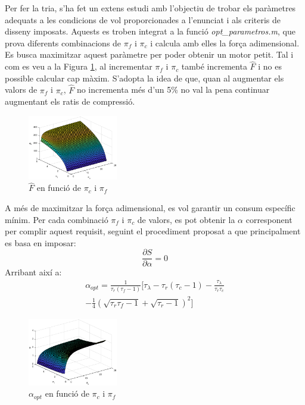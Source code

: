 \noindent Per fer la tria,  s'ha fet un extens estudi amb l'objectiu de trobar els paràmetres adequats a les condicions de vol proporcionades a l'enunciat i als criteris de disseny imposats. Aquests es troben integrat a la funció \textit{opt\_parametros.m}, que prova diferents combinacions de $\pi_f$ i $\pi_c$ i calcula amb elles la força adimensional. Es busca maximitzar aquest paràmetre per poder obtenir un motor petit. Tal i com es veu a la Figura \ref{Fadimensional}, al incrementar $\pi_f$ i $\pi_c$ també incrementa \(\hat{F}\) i no es possible calcular cap màxim. S'adopta la idea de que, quan al augmentar els valors de $\pi_f$ i $\pi_c$, \(\hat{F}\) no incrementa més d'un 5\% no val la pena continuar augmentant els ratis de compressió.
\begin{figure}[H]
	\centering
	\includegraphics[width=0.35\textwidth]{./pics/F_pc_pf}
	\caption{\(\hat{F}\) en funció de $\pi_c$ i $\pi_f$}
	\label{Fadimensional}
\end{figure}
\noindent A més de maximitzar la força adimensional, es vol garantir un consum específic mínim. Per cada combinació  $\pi_f$ i $\pi_c$ de valors, es pot obtenir la $\alpha$ corresponent per complir aquest requisit, seguint el procediment proposat a \cite[5-10]{mattingly} que principalment es basa en imposar:
\begin{equation*}
	\frac{\partial S}{\partial \alpha} = 0 
\end{equation*}
Arribant així a:
\begin{multline}
	\alpha_{opt} = \frac{1}{\tau_r(\tau_f-1)}\bigg[\tau_{\lambda}-\tau_r(\tau_c-1)-\frac{\tau_{\lambda}}{\tau_r\tau_c} \\ -\frac{1}{4}(\sqrt{\tau_r\tau_f-1} + \sqrt{\tau_r-1})^2\bigg]
\end{multline}
\begin{figure}[H]
	\centering
	\includegraphics[width=0.35\textwidth]{./pics/alpha_pc_pf}
	\caption{$\alpha_{opt}$ en funció de $\pi_c$ i $\pi_f$}
\end{figure}
